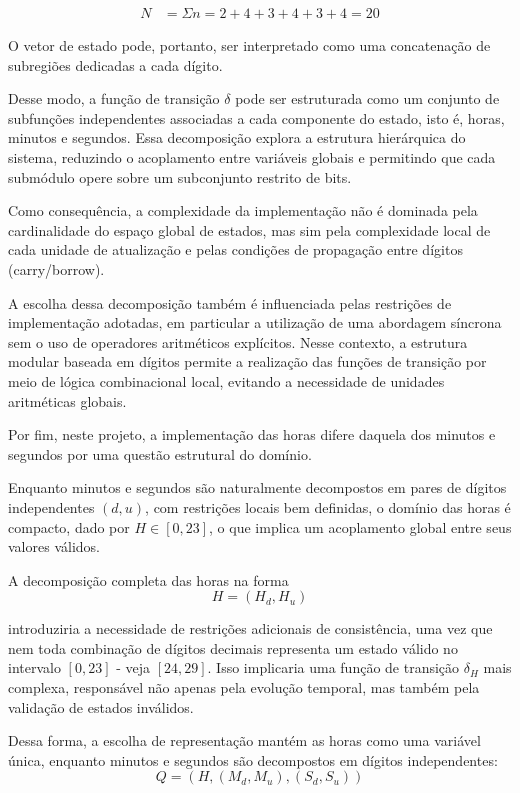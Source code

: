\begin{align*}
    N &= \Sigma n = 2 + 4 + 3 + 4 + 3 + 4 = 20
\end{align*}

O vetor de estado pode, portanto, ser interpretado como uma concatenação de subregiões dedicadas a cada dígito.

Desse modo, a função de transição $\delta$ pode ser estruturada como um conjunto de subfunções independentes associadas a cada componente do estado, isto é, horas, minutos e segundos. Essa decomposição explora a estrutura hierárquica do sistema, reduzindo o acoplamento entre variáveis globais e permitindo que cada submódulo opere sobre um subconjunto restrito de bits.

Como consequência, a complexidade da implementação não é dominada pela cardinalidade do espaço global de estados, mas sim pela complexidade local de cada unidade de atualização e pelas condições de propagação entre dígitos (carry/borrow).

A escolha dessa decomposição também é influenciada pelas restrições de implementação adotadas, em particular a utilização de uma abordagem síncrona sem o uso de operadores aritméticos explícitos. Nesse contexto, a estrutura modular baseada em dígitos permite a realização das funções de transição por meio de lógica combinacional local, evitando a necessidade de unidades aritméticas globais.

Por fim, neste projeto, a implementação das horas difere daquela dos minutos e segundos por uma questão estrutural do domínio.

Enquanto minutos e segundos são naturalmente decompostos em pares de dígitos independentes $(d, u)$, com restrições locais bem definidas, o domínio das horas é compacto, dado por $H \in [0,23]$, o que implica um acoplamento global entre seus valores válidos.

A decomposição completa das horas na forma
\[
H = (H_d, H_u)
\]

introduziria a necessidade de restrições adicionais de consistência, uma vez que nem toda combinação de dígitos decimais representa um estado válido no intervalo $[0,23]$ - veja $[24,29]$. Isso implicaria uma função de transição $\delta_H$ mais complexa, responsável não apenas pela evolução temporal, mas também pela validação de estados inválidos.

Dessa forma, a escolha de representação mantém as horas como uma variável única, enquanto minutos e segundos são decompostos em dígitos independentes:
\[
Q = (H, (M_d, M_u), (S_d, S_u))
\]
